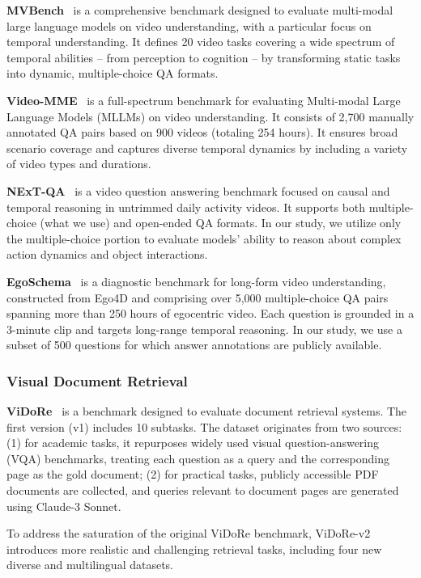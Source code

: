 \textbf{MVBench}~\citep{mvbench} is a comprehensive benchmark designed to evaluate multi-modal large language models on video understanding, with a particular focus on temporal understanding. It defines 20 video tasks covering a wide spectrum of temporal abilities -- from perception to cognition -- by transforming static tasks into dynamic, multiple-choice QA formats. 

\textbf{Video-MME}~\citep{videomme} is a full-spectrum benchmark for evaluating Multi-modal Large Language Models (MLLMs) on video understanding. It consists of 2,700 manually annotated QA pairs based on 900 videos (totaling 254 hours). It ensures broad scenario coverage and captures diverse temporal dynamics by including a variety of video types and durations.

\textbf{NExT-QA}~\citep{nextqa} is a video question answering benchmark focused on causal and temporal reasoning in untrimmed daily activity videos. It supports both multiple-choice (what we use) and open-ended QA formats. In our study, we utilize only the multiple-choice portion to evaluate models' ability to reason about complex action dynamics and object interactions.

\textbf{EgoSchema}~\citep{egoschema} is a diagnostic benchmark for long-form video understanding, constructed from Ego4D and comprising over 5,000 multiple-choice QA pairs spanning more than 250 hours of egocentric video. Each question is grounded in a 3-minute clip and targets long-range temporal reasoning. In our study, we use a subset of 500 questions for which answer annotations are publicly available.




\subsubsection{Visual Document Retrieval}
\textbf{ViDoRe}~\citep{colpali, vidore_v2} is a benchmark designed to evaluate document retrieval systems. The first version (v1) includes 10 subtasks. The dataset originates from two sources: (1) for academic tasks, it repurposes widely used visual question-answering (VQA) benchmarks, treating each question as a query and the corresponding page as the gold document; (2) for practical tasks, publicly accessible PDF documents are collected, and queries relevant to document pages are generated using Claude-3 Sonnet. 

To address the saturation of the original ViDoRe benchmark, ViDoRe-v2 introduces more realistic and challenging retrieval tasks, including four new diverse and multilingual datasets.


